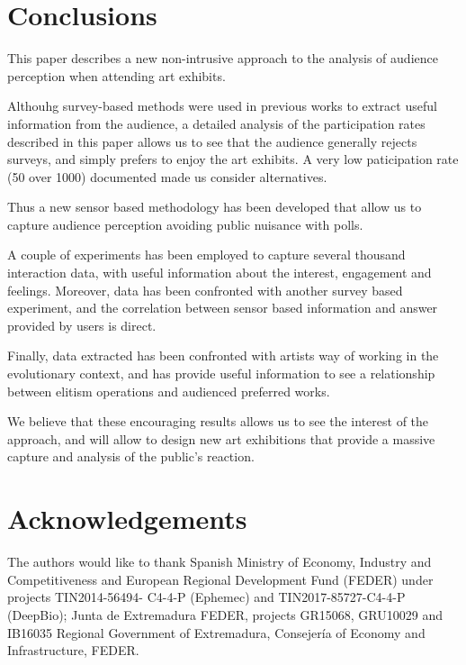 \documentclass[graybox]{svmult}
\begin{document}
\section{Conclusions}
%

This paper describes a new non-intrusive approach to the analysis of audience perception when attending art exhibits.

Althouhg survey-based methods were used in previous works to extract useful information from the audience, a detailed analysis of the participation rates described in this paper allows us to see that the audience generally rejects surveys, and simply prefers to enjoy the art exhibits.  A very low paticipation rate (50 over 1000) documented made us consider alternatives.

Thus a new sensor based methodology has been developed that allow us to capture audience perception avoiding public nuisance with polls. 

A couple of experiments has been employed to capture several thousand interaction data, with useful information about the interest, engagement and feelings.  Moreover, data has been confronted with another survey based experiment, and the correlation between sensor based information and answer provided by users is direct. 

Finally, data extracted has been confronted with artists way of working in the evolutionary context, and has provide useful information to see a relationship between elitism operations and audienced preferred works.

We believe that these encouraging results allows us to see the interest of the approach, and will allow to design new art exhibitions that provide a massive capture and analysis of the public's reaction.

\section*{Acknowledgements}
\sloppypar  The authors would like to thank Spanish Ministry of Economy,
Industry and Competitiveness and European Regional
Development Fund (FEDER) under projects TIN2014-56494-
C4-4-P (Ephemec) and TIN2017-85727-C4-4-P (DeepBio);
Junta de Extremadura FEDER, projects GR15068, GRU10029 and IB16035
Regional Government of Extremadura, Consejer\'ia of Economy
and Infrastructure, FEDER.







\end{document}
